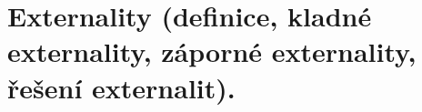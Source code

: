 \clearpage
\section{Externality (definice, kladné externality, záporné externality, řešení externalit).}